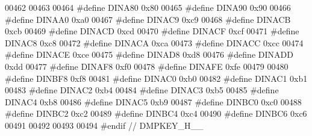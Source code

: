 \begin{DoxyCode}
00462 
00463 
00464 \textcolor{preprocessor}{#define DINA80 0x80}
00465 \textcolor{preprocessor}{#define DINA90 0x90}
00466 \textcolor{preprocessor}{#define DINAA0 0xa0}
00467 \textcolor{preprocessor}{#define DINAC9 0xc9}
00468 \textcolor{preprocessor}{#define DINACB 0xcb}
00469 \textcolor{preprocessor}{#define DINACD 0xcd}
00470 \textcolor{preprocessor}{#define DINACF 0xcf}
00471 \textcolor{preprocessor}{#define DINAC8 0xc8}
00472 \textcolor{preprocessor}{#define DINACA 0xca}
00473 \textcolor{preprocessor}{#define DINACC 0xcc}
00474 \textcolor{preprocessor}{#define DINACE 0xce}
00475 \textcolor{preprocessor}{#define DINAD8 0xd8}
00476 \textcolor{preprocessor}{#define DINADD 0xdd}
00477 \textcolor{preprocessor}{#define DINAF8 0xf0}
00478 \textcolor{preprocessor}{#define DINAFE 0xfe}
00479 
00480 \textcolor{preprocessor}{#define DINBF8 0xf8}
00481 \textcolor{preprocessor}{#define DINAC0 0xb0}
00482 \textcolor{preprocessor}{#define DINAC1 0xb1}
00483 \textcolor{preprocessor}{#define DINAC2 0xb4}
00484 \textcolor{preprocessor}{#define DINAC3 0xb5}
00485 \textcolor{preprocessor}{#define DINAC4 0xb8}
00486 \textcolor{preprocessor}{#define DINAC5 0xb9}
00487 \textcolor{preprocessor}{#define DINBC0 0xc0}
00488 \textcolor{preprocessor}{#define DINBC2 0xc2}
00489 \textcolor{preprocessor}{#define DINBC4 0xc4}
00490 \textcolor{preprocessor}{#define DINBC6 0xc6}
00491 
00492 
00493 
00494 \textcolor{preprocessor}{#endif // DMPKEY\_H\_\_}
\end{DoxyCode}
